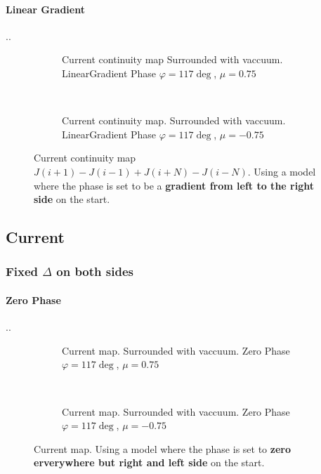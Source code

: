 \documentclass[../main.tex]{subfiles}
\begin{document}
\paragraph{Linear Gradient}..
\begin{figure}[H]
    \begin{subfigure}{0.4\textwidth}
        \centering
        \hspace{-4cm} %
        
        \caption{Current continuity map Surrounded with vaccuum. LinearGradient Phase $\varphi = 117\deg$, $\mu = 0.75$}
        \label{fig:first}
    \end{subfigure}    \\
    \begin{subfigure}{0.4\textwidth}
        \centering
        \hspace{-4cm} %
        
        \caption{Current continuity map. Surrounded with vaccuum. LinearGradient Phase $\varphi = 117\deg$, $\mu = -0.75$}
        \label{fig:first}
    \end{subfigure}    
    \caption{Current continuity map $J(i+1) - J(i-1) + J(i+N)- J(i-N)$. Using a model where the phase is set to be a \textbf{gradient from left to the right side} on the start.}
\end{figure}


\subsection{Current}
\subsubsection{Fixed $\Delta$ on both sides}
\paragraph{Zero Phase}..
\begin{figure}[H]
    \begin{subfigure}{0.4\textwidth}
        \centering
        \hspace{-4cm} %
        
        \caption{Current  map. Surrounded with vaccuum. Zero Phase $\varphi = 117\deg$, $\mu = 0.75$}
        \label{fig:first}
    \end{subfigure}    \\
    \begin{subfigure}{0.4\textwidth}
        \centering
        \hspace{-4cm} %
        
        \caption{Current  map. Surrounded with vaccuum. Zero Phase $\varphi = 117\deg$, $\mu = -0.75$}
        \label{fig:first}
    \end{subfigure}    
    \caption{ Current map. Using a model where the phase is set to \textbf{zero erverywhere but right and left side} on the start.}
\end{figure}
\end{document}
